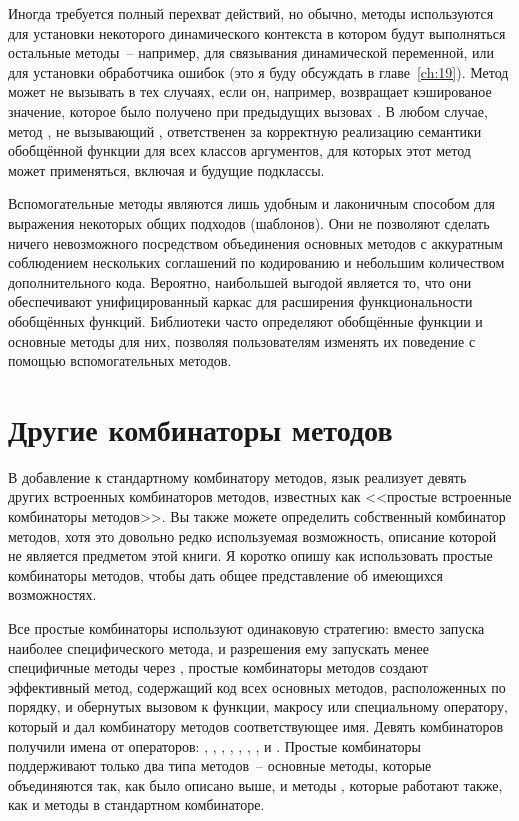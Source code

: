 Иногда требуется полный перехват действий, но обычно, методы  используются
для установки некоторого динамического контекста в котором будут выполняться остальные
методы~-- например, для связывания динамической переменной, или для установки обработчика
ошибок (это я буду обсуждать в главе~\ref{ch:19}).  Метод  может не вызывать
 в тех случаях, если он, например, возвращает кэшированое значение,
которое было получено при предыдущих вызовах .  В любом случае,
метод , не вызывающий , ответственен за корректную
реализацию семантики обобщённой функции для всех классов аргументов, для которых этот
метод может применяться, включая и будущие подклассы.

Вспомогательные методы являются лишь удобным и лаконичным способом для выражения некоторых
общих подходов (шаблонов).  Они не позволяют сделать ничего невозможного посредством
объединения основных методов с аккуратным соблюдением нескольких соглашений по кодированию
и небольшим количеством дополнительного кода. Вероятно, наибольшей выгодой является то,
что они обеспечивают унифицированный каркас для расширения функциональности обобщённых
функций.  Библиотеки часто определяют обобщённые функции и основные методы для них,
позволяя пользователям изменять их поведение с помощью вспомогательных методов.

\section{Другие комбинаторы методов}

В добавление к стандартному комбинатору методов, язык реализует девять других встроенных
комбинаторов методов, известных как <<простые встроенные комбинаторы методов>>.  Вы также
можете определить собственный комбинатор методов, хотя это довольно редко используемая
возможность, описание которой не является предметом этой книги.  Я коротко опишу как
использовать простые комбинаторы методов, чтобы дать общее представление об имеющихся
возможностях.

Все простые комбинаторы используют одинаковую стратегию: вместо запуска наиболее
специфического метода, и разрешения ему запускать менее специфичные методы через
, простые комбинаторы методов создают эффективный метод, содержащий
код всех основных методов, расположенных по порядку, и обернутых вызовом к функции,
макросу или специальному оператору, который и дал комбинатору методов соответствующее имя.
Девять комбинаторов получили имена от операторов: \code{+}, , ,
, , , ,  и .  Простые
комбинаторы поддерживают только два типа методов~-- основные методы, которые объединяются
так, как было описано выше, и методы , которые работают также, как и методы
 в стандартном комбинаторе.

